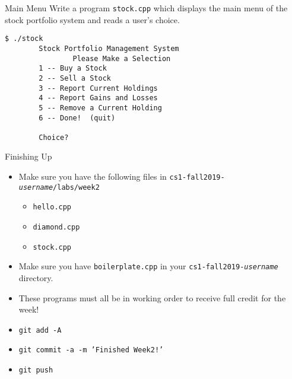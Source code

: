 \documentclass{beamer}
\begin{document}
\begin{frame}[fragile]{Main Menu}
Write a program \texttt{stock.cpp} which displays the main menu of the
stock portfolio system and reads a user's choice.  
\begin{verbatim}
$ ./stock
        Stock Portfolio Management System
                Please Make a Selection
        1 -- Buy a Stock
        2 -- Sell a Stock
        3 -- Report Current Holdings
        4 -- Report Gains and Losses
        5 -- Remove a Current Holding
        6 -- Done!  (quit) 

        Choice? 
\end{verbatim}

\end{frame}

\begin{frame}{Finishing Up}
\begin{itemize}
    \item Make sure you have the following files in
        \texttt{cs1-fall2019-{\em username}/labs/week2}
        \begin{itemize}
            \item \texttt{hello.cpp}
            \item \texttt{diamond.cpp}
            \item \texttt{stock.cpp}
        \end{itemize}
    \item Make sure you have \texttt{boilerplate.cpp} in your
        \texttt{cs1-fall2019-{\em username}} directory.
    \item These programs must all be in working order to receive full
        credit for the week!
    \item \texttt{git add -A}
    \item \texttt{git commit -a -m 'Finished Week2!'}
    \item \texttt{git push}
\end{itemize}
\end{frame}
\end{document}

